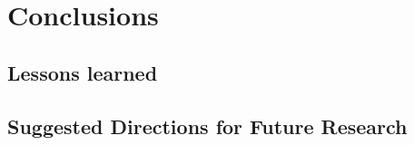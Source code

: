 \documentclass[a4paper,11pt]{kth-mag}
\begin{document}
\section{Conclusions}
\subsection{Lessons learned}
\subsection{Suggested Directions for Future Research}
\begin{comment}
\begin{figure}[ht]
\begin{center}
And here is a figure
\caption{\small{Several statements describing the same resource.}}\label{RDF_4}
\end{center}
\end{figure}


that we refer to here: \ref{RDF_4}
\end{comment}
\printbibliography
\end{document}
